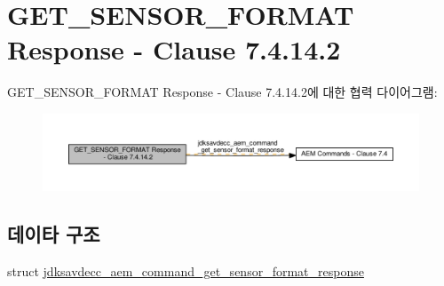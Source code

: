 \hypertarget{group__command__get__sensor__format__response}{}\section{G\+E\+T\+\_\+\+S\+E\+N\+S\+O\+R\+\_\+\+F\+O\+R\+M\+AT Response -\/ Clause 7.4.14.2}
\label{group__command__get__sensor__format__response}
G\+E\+T\+\_\+\+S\+E\+N\+S\+O\+R\+\_\+\+F\+O\+R\+M\+AT Response -\/ Clause 7.4.14.2에 대한 협력 다이어그램\+:
\nopagebreak
\begin{figure}[H]
\begin{center}
\leavevmode
\includegraphics[width=350pt]{group__command__get__sensor__format__response}
\end{center}
\end{figure}
\subsection*{데이타 구조}
\begin{DoxyCompactItemize}
\item 
struct \hyperlink{structjdksavdecc__aem__command__get__sensor__format__response}{jdksavdecc\+\_\+aem\+\_\+command\+\_\+get\+\_\+sensor\+\_\+format\+\_\+response}
\end{DoxyCompactItemize}

